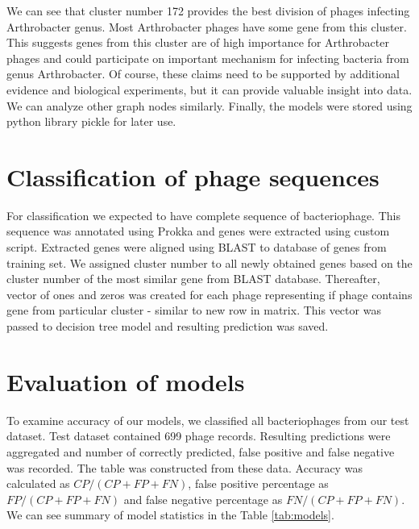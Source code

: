 We can see that cluster number 172 provides the best division of phages infecting Arthrobacter genus.
Most Arthrobacter phages have some gene from this cluster.
This suggests genes from this cluster are of high importance for Arthrobacter phages and could participate on important mechanism for infecting bacteria from genus Arthrobacter.
Of course, these claims need to be supported by additional evidence and biological experiments, but it can provide valuable insight into data.
We can analyze other graph nodes similarly.
Finally, the models were stored using python library pickle for later use.


\section{Classification of phage sequences}
For classification we expected to have complete sequence of bacteriophage.
This sequence was annotated using Prokka and genes were extracted using custom script.
Extracted genes were aligned using BLAST to database of genes from training set.
We assigned cluster number to all newly obtained genes based on the cluster number of the most similar gene from BLAST database.
Thereafter, vector of ones and zeros was created for each phage representing if phage contains gene from particular cluster - similar to new row in matrix.
This vector was passed to decision tree model and resulting prediction was saved.

\section{Evaluation of models}
To examine accuracy of our models, we classified all bacteriophages from our test dataset.
Test dataset contained 699 phage records.
Resulting predictions were aggregated and number of correctly predicted, false positive and false negative was recorded.
The table was constructed from these data.
Accuracy was calculated as $CP/(CP+FP+FN)$, false positive percentage as $FP/(CP+FP+FN)$ and false negative percentage as $FN/(CP+FP+FN)$.
We can see summary of model statistics in the Table \ref{tab:models}. 

